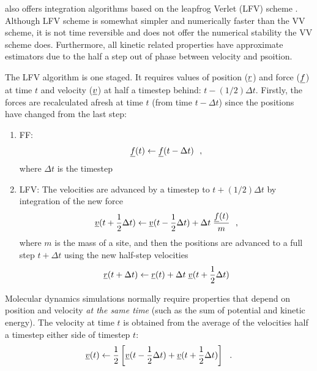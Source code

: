\D also offers integration algorithms based on the leapfrog Verlet
(LFV) scheme \cite{allen-89a}.  Although LFV scheme is somewhat
simpler and numerically faster than the VV scheme, it is not time
reversible and does not offer the numerical stability the VV scheme
does.  Furthermore, all kinetic related properties have approximate
estimators due to the half a step out of phase between velocity and psoition.

The LFV algorithm is one staged.  It requires values of position
($\mbox{$\underline{r}$}$) and force ($\mbox{$\underline{f}$}$) at time $t$ and  velocity
($\mbox{$\underline{v}$}$) at half a timestep behind: $t-(1/2)\Delta t$.  Firstly,
the forces are recalculated afresh at time $t$ (from time
$t-\Delta t$) since the positions have changed from the last step:
\begin{enumerate}
\item FF:
\begin{equation}
\mbox{$\underline{f}$}(t) \leftarrow \mbox{$\underline{f}$}(t - \Delta t)~~,
\end{equation}
where $\Delta t$ is the timestep
\item LFV:
\newline The velocities are advanced by a timestep to
$t+(1/2)\Delta t$ by integration of the new force
\begin{equation}
\mbox{$\underline{v}$}(t + {1 \over 2} \Delta t) \leftarrow \mbox{$\underline{v}$}(t - {1 \over 2} \Delta t) +
\Delta t \; {\mbox{$\underline{f}$}(t) \over m}~~,
\end{equation}
where $m$ is the mass of a site, and then the positions are
advanced to a full step $t+\Delta t$ using the new half-step
velocities
\begin{equation}
\mbox{$\underline{r}$}(t + \Delta t) \leftarrow \mbox{$\underline{r}$}(t) + \Delta t \;
\mbox{$\underline{v}$}(t + {1 \over 2}\Delta t)
\end{equation}
\end{enumerate}
Molecular dynamics simulations normally require properties that
depend on position and velocity {\em at the same time} (such as
the sum of potential and kinetic energy).  The velocity at time
$t$ is obtained from the average of the velocities half a timestep
either side of timestep $t$:
\begin{equation}
\mbox{$\underline{v}$}(t) \leftarrow {1 \over 2} \left[ \mbox{$\underline{v}$}(t - {1 \over 2} \Delta t) +
\mbox{$\underline{v}$}(t + {1 \over 2} \Delta t) \right]~~.
\end{equation}

